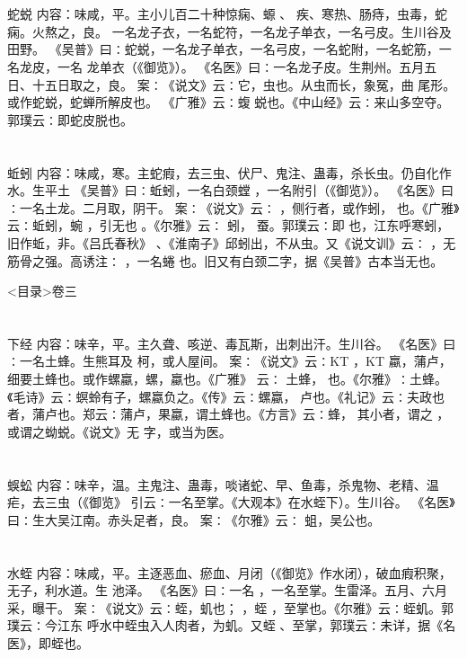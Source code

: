 \documentclass[12pt,UTF8]{ctexbook}
\begin{document}
\section{}蛇蜕
内容：味咸，平。主小儿百二十种惊痫、螈 、 疾、寒热、肠痔，虫毒，蛇痫。火熬之，良。 
一名龙子衣，一名蛇符，一名龙子单衣，一名弓皮。生川谷及田野。 
《吴普》曰∶蛇蜕，一名龙子单衣，一名弓皮，一名蛇附，一名蛇筋，一名龙皮，一名 
龙单衣（《御览》）。 
《名医》曰∶一名龙子皮。生荆州。五月五日、十五日取之，良。 
案∶《说文》云∶它，虫也。从虫而长，象冤，曲 尾形。或作蛇蜕，蛇蝉所解皮也。 
《广雅》云∶蝮 蜕也。《中山经》云∶来山多空夺。郭璞云∶即蛇皮脱也。 


\section{}蚯蚓
内容：味咸，寒。主蛇瘕，去三虫、伏尸、鬼注、蛊毒，杀长虫。仍自化作水。生平土 
《吴普》曰∶蚯蚓，一名白颈螳 ，一名附引（《御览》）。 
《名医》曰∶一名土龙。二月取，阴干。 
案∶《说文》云∶ ，侧行者，或作蚓， 也。《广雅》云∶蚯蚓，蜿 ，引无也 
。《尔雅》云∶ 蚓， 蚕。郭璞云∶即 也，江东呼寒蚓，旧作蚯，非。《吕氏春秋》 
、《淮南子》邱蚓出，不从虫。又《说文训》云∶ ，无筋骨之强。高诱注∶ ，一名蜷 
也。旧又有白颈二字，据《吴普》古本当无也。 

<目录>卷三
\section{}下经
内容：味辛，平。主久聋、咳逆、毒瓦斯，出刺出汗。生川谷。 
《名医》曰∶一名土蜂。生熊耳及 柯，或人屋间。 
案∶《说文》云∶KT ，KT 蠃，蒲卢，细要土蜂也。或作螺蠃，螺，蠃也。《广雅》 
云∶ 
土蜂， 也。《尔雅》∶土蜂。《毛诗》云∶螟蛉有子，螺蠃负之。《传》云∶螺蠃， 
卢也。《礼记》云∶夫政也者，蒲卢也。郑云∶蒲卢，果蠃，谓土蜂也。《方言》云∶蜂， 
其小者，谓之 ，或谓之蚴蜕。《说文》无 字，或当为医。 


\section{}蜈蚣
内容：味辛，温。主鬼注、蛊毒，啖诸蛇、早、鱼毒，杀鬼物、老精、温疟，去三虫（《御览》 
引云∶一名至掌。《大观本》在水蛭下）。生川谷。 
《名医》曰∶生大吴江南。赤头足者，良。 
案∶《尔雅》云∶ 蛆，吴公也。 


\section{}水蛭
内容：味咸，平。主逐恶血、瘀血、月闭（《御览》作水闭），破血瘕积聚，无子，利水道。生 
池泽。 
《名医》曰∶一名 ，一名至掌。生雷泽。五月、六月采，曝干。 
案∶《说文》云∶蛭，虮也； ，蛭 ，至掌也。《尔雅》云∶蛭虮。郭璞云∶今江东 
呼水中蛭虫入人肉者，为虮。又蛭 、至掌，郭璞云∶未详，据《名医》，即蛭也。 
\end{document}
